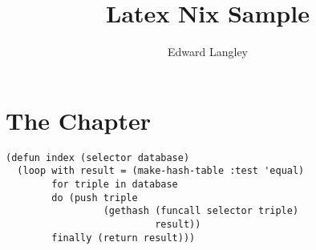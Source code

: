 \documentclass[12pt]{memoir}
\title{Latex Nix Sample}
\author{Edward Langley}
\begin{document}
\maketitle

\chapter{The Chapter}

\lipsum[1-4]

\begin{verbatim}
(defun index (selector database)
  (loop with result = (make-hash-table :test 'equal)
        for triple in database
        do (push triple
                 (gethash (funcall selector triple)
                          result))
        finally (return result)))
\end{verbatim}

\lipsum[6-9]
\end{document}
